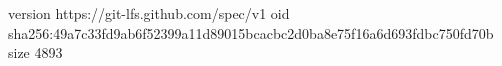 version https://git-lfs.github.com/spec/v1
oid sha256:49a7c33fd9ab6f52399a11d89015bcacbc2d0ba8e75f16a6d693fdbc750fd70b
size 4893
